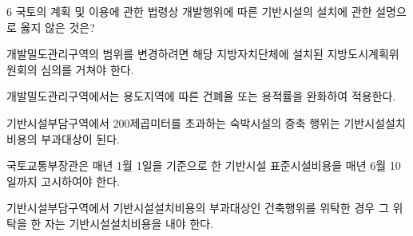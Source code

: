 \begin{question}{6}
국토의 계획 및 이용에 관한 법령상 개발행위에 따른 기반시설의 설치에 관한 설명으로 옳지 않은 것은?
\begin{choices}
  \item 개발밀도관리구역의 범위를 변경하려면 해당 지방자치단체에 설치된 지방도시계획위원회의 심의를 거쳐야 한다.
  \item 개발밀도관리구역에서는 용도지역에 따른 건폐율 또는 용적률을 완화하여 적용한다.
  \item 기반시설부담구역에서 200제곱미터를 초과하는 숙박시설의 증축 행위는 기반시설설치 비용의 부과대상이 된다.
  \item 국토교통부장관은 매년 1월 1일을 기준으로 한 기반시설 표준시설비용을 매년 6월 10일까지 고시하여야 한다.
  \item 기반시설부담구역에서 기반시설설치비용의 부과대상인 건축행위를 위탁한 경우 그 위탁을 한 자는 기반시설설치비용을 내야 한다.
\end{choices}
\end{question}
